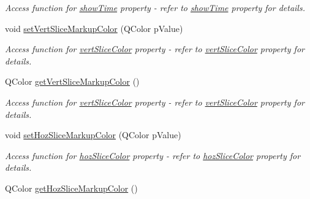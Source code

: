 \begin{DoxyCompactItemize}
\begin{DoxyCompactList}\small\item\em Access function for \hyperlink{classQEImage_a51abf900097601e100eb03060ca173dc}{showTime} property -\/ refer to \hyperlink{classQEImage_a51abf900097601e100eb03060ca173dc}{showTime} property for details. \end{DoxyCompactList}\item 
\hypertarget{classQEImage_abe5f9093c6fa5f6fadc3ee5cbf3bb4a2}{
void \hyperlink{classQEImage_abe5f9093c6fa5f6fadc3ee5cbf3bb4a2}{setVertSliceMarkupColor} (QColor pValue)}
\label{classQEImage_abe5f9093c6fa5f6fadc3ee5cbf3bb4a2}

\begin{DoxyCompactList}\small\item\em Access function for \hyperlink{classQEImage_ab5da21cd9976c568c4570ef51e055c4e}{vertSliceColor} property -\/ refer to \hyperlink{classQEImage_ab5da21cd9976c568c4570ef51e055c4e}{vertSliceColor} property for details. \end{DoxyCompactList}\item 
\hypertarget{classQEImage_a527cc151dd5cfafacb0586f6fb63b263}{
QColor \hyperlink{classQEImage_a527cc151dd5cfafacb0586f6fb63b263}{getVertSliceMarkupColor} ()}
\label{classQEImage_a527cc151dd5cfafacb0586f6fb63b263}

\begin{DoxyCompactList}\small\item\em Access function for \hyperlink{classQEImage_ab5da21cd9976c568c4570ef51e055c4e}{vertSliceColor} property -\/ refer to \hyperlink{classQEImage_ab5da21cd9976c568c4570ef51e055c4e}{vertSliceColor} property for details. \end{DoxyCompactList}\item 
\hypertarget{classQEImage_a7e12fd9430d03500a8eea0063f20fcb2}{
void \hyperlink{classQEImage_a7e12fd9430d03500a8eea0063f20fcb2}{setHozSliceMarkupColor} (QColor pValue)}
\label{classQEImage_a7e12fd9430d03500a8eea0063f20fcb2}

\begin{DoxyCompactList}\small\item\em Access function for \hyperlink{classQEImage_a9e69a916b1c656c1be7bc07727294756}{hozSliceColor} property -\/ refer to \hyperlink{classQEImage_a9e69a916b1c656c1be7bc07727294756}{hozSliceColor} property for details. \end{DoxyCompactList}\item 
\hypertarget{classQEImage_a2a5356163de90eca0256e34e052fbb59}{
QColor \hyperlink{classQEImage_a2a5356163de90eca0256e34e052fbb59}{getHozSliceMarkupColor} ()}
\label{classQEImage_a2a5356163de90eca0256e34e052fbb59}


\end{DoxyCompactItemize}
